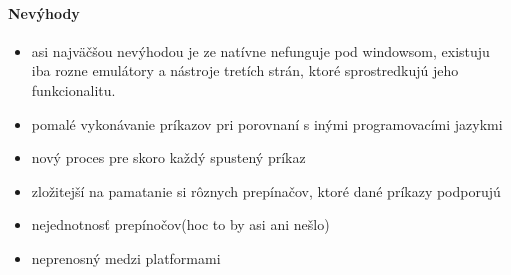 \paragraph{Nevýhody}
\begin{itemize}
	\item asi najväčšou nevýhodou je ze natívne nefunguje pod windowsom, existuju iba rozne emulátory a nástroje tretích strán, ktoré sprostredkujú jeho funkcionalitu.
	\item pomalé vykonávanie príkazov pri porovnaní s inými programovacími jazykmi
	\item nový proces pre skoro každý spustený príkaz
	\item zložitejší na pamatanie si rôznych prepínačov, ktoré dané príkazy podporujú
	\item nejednotnosť prepínočov(hoc to by asi ani nešlo)
	\item neprenosný medzi platformami
\end{itemize}
